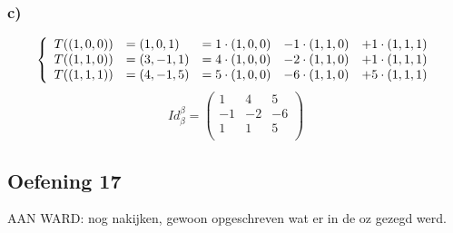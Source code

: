 \documentclass[lineaire_algebra_oplossingen.tex]{subfiles}
\begin{document}
\subsubsection*{c)}
\[
\left\lbrace
\begin{array}{c l c c c}
T((1,0,0)) &= (1,0,1) &= 1\cdot (1,0,0) &- 1\cdot (1,1,0) &+ 1\cdot (1,1,1)\\
T((1,1,0)) &= (3,-1,1)&= 4\cdot (1,0,0) &- 2\cdot (1,1,0) &+ 1\cdot (1,1,1)\\
T((1,1,1)) &= (4,-1,5)&= 5\cdot (1,0,0) &- 6\cdot (1,1,0) &+ 5\cdot (1,1,1)\\
\end{array}
\right.
\]
\[
Id_\beta^\beta = 
\begin{pmatrix}
1 & 4 & 5\\
-1 & -2 & -6\\
1 & 1 & 5\\
\end{pmatrix}
\]

\subsection{Oefening 17}
AAN WARD: nog nakijken, gewoon opgeschreven wat er in de oz gezegd werd.
\end{document}
